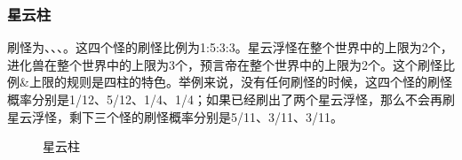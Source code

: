 \subsubsection{星云柱}
刷怪为、、、。这四个怪的刷怪比例为1:5:3:3。星云浮怪在整个世界中的上限为2个，进化兽在整个世界中的上限为3个，预言帝在整个世界中的上限为2个。这个刷怪比例\&上限的规则是四柱的特色。举例来说，没有任何刷怪的时候，这四个怪的刷怪概率分别是1/12、5/12、1/4、1/4；如果已经刷出了两个星云浮怪，那么不会再刷星云浮怪，剩下三个怪的刷怪概率分别是5/11、3/11、3/11。
\begin{figure}[h]
    \centering
    \caption{星云柱}
\end{figure}

